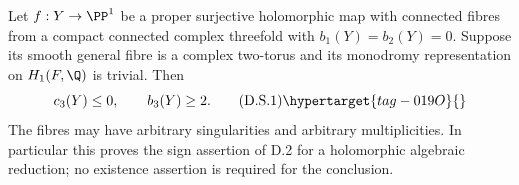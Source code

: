 \begin{proposition}\hypertarget{tag-01GC}{}\label{cdp:st:D.2.5}



Let $f:Y\to\PP^1$ be a proper surjective holomorphic map with
connected fibres from a compact connected complex threefold with
$b_1(Y)=b_2(Y)=0$. Suppose its smooth general fibre is a complex
two-torus and its monodromy representation on $H_1(F,\Q)$ is
trivial. Then
\[
 c_3(Y)\le0,\qquad b_3(Y)\ge2.
 \tag{D.S.1}\hypertarget{tag-019O}{}\label{cdp:eq:D.S.1}
\]
The fibres may have arbitrary singularities and arbitrary
multiplicities. In particular this proves the sign assertion of
D.2 for a holomorphic algebraic reduction; no existence assertion
is required for the conclusion.
\end{proposition}

